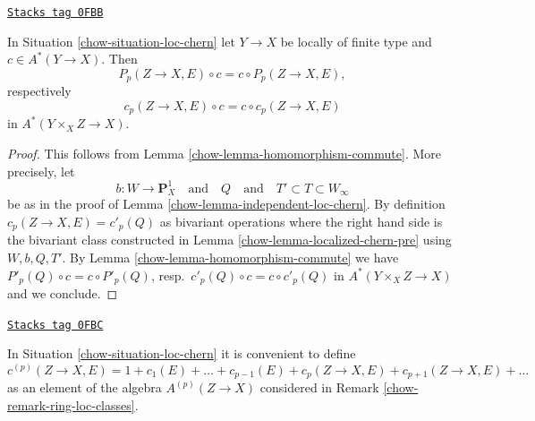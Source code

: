 \begin{lemma}
\label{chow-lemma-loc-chern-classes-commute}
\href{https://stacks.math.columbia.edu/tag/0FBB}{\texttt{Stacks tag 0FBB}}

In Situation \ref{chow-situation-loc-chern}
let $Y \to X$ be locally of finite type and $c \in A^*(Y \to X)$.
Then
$$
P_p(Z \to X, E) \circ c = c \circ P_p(Z \to X, E),
$$
respectively
$$
c_p(Z \to X, E) \circ c = c \circ c_p(Z \to X, E)
$$
in $A^*(Y \times_X Z \to X)$.
\end{lemma}

\begin{proof}

This follows from Lemma \ref{chow-lemma-homomorphism-commute}.
More precisely, let
$$
b : W \to \mathbf{P}^1_X
\quad\text{and}\quad
Q
\quad\text{and}\quad
T' \subset T \subset W_\infty
$$
be as in the proof of Lemma \ref{chow-lemma-independent-loc-chern}.
By definition $c_p(Z \to X, E) = c'_p(Q)$
as bivariant operations
where the right hand side is the bivariant class constructed in
Lemma \ref{chow-lemma-localized-chern-pre} using $W, b, Q, T'$.
By Lemma \ref{chow-lemma-homomorphism-commute} we have
$P'_p(Q) \circ c = c \circ P'_p(Q)$, resp.\ $c'_p(Q) \circ c = c \circ c'_p(Q)$
in $A^*(Y \times_X Z \to X)$ and we conclude.
\end{proof}

\begin{remark}
\label{chow-remark-loc-chern-classes}
\href{https://stacks.math.columbia.edu/tag/0FBC}{\texttt{Stacks tag 0FBC}}

In Situation \ref{chow-situation-loc-chern} it is convenient to define
$$
c^{(p)}(Z \to X, E) = 1 + c_1(E) + \ldots + c_{p - 1}(E) +
c_p(Z \to X, E) + c_{p + 1}(Z \to X, E) + \ldots
$$
as an element of the algebra $A^{(p)}(Z \to X)$ considered in
Remark \ref{chow-remark-ring-loc-classes}.
\end{remark}

